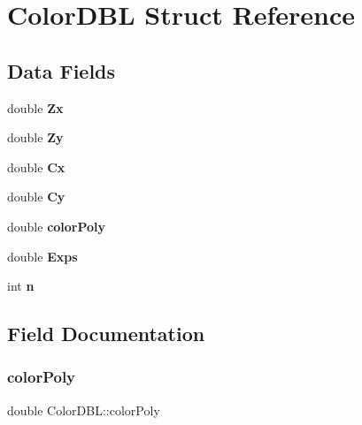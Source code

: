 \hypertarget{struct_color_d_b_l}{}\section{Color\+D\+BL Struct Reference}
\label{struct_color_d_b_l}
\subsection*{Data Fields}
\begin{DoxyCompactItemize}
\item 
\mbox{\label{struct_color_d_b_l_afc3882aafb004e9426d0672e7c01edaf}} 
double {\bfseries Zx}
\item 
\mbox{\label{struct_color_d_b_l_a295cfca80e80dc85e9ae1b13194a0287}} 
double {\bfseries Zy}
\item 
\mbox{\label{struct_color_d_b_l_a2a18d1e704fd3e7edd36e58aa1ad608e}} 
double {\bfseries Cx}
\item 
\mbox{\label{struct_color_d_b_l_a846fc0a4774b9a47d7dcc197aac61775}} 
double {\bfseries Cy}
\item 
\mbox{\label{struct_color_d_b_l_a0036bac7853b4736d63df2c9ddd5415f}} 
double {\bfseries color\+Poly}
\item 
\mbox{\label{struct_color_d_b_l_ae15fca56fd7556c23cbe7c527989d4fb}} 
double {\bfseries Exps}
\item 
\mbox{\label{struct_color_d_b_l_a386d58a5189f753a7f74e3d7f250cf29}} 
int {\bfseries n}
\end{DoxyCompactItemize}


\subsection{Field Documentation}
\mbox{\label{struct_color_d_b_l_a0036bac7853b4736d63df2c9ddd5415f}} 
\subsubsection{\texorpdfstring{color\+Poly}{colorPoly}}
{\footnotesize\ttfamily double Color\+D\+B\+L\+::color\+Poly}

